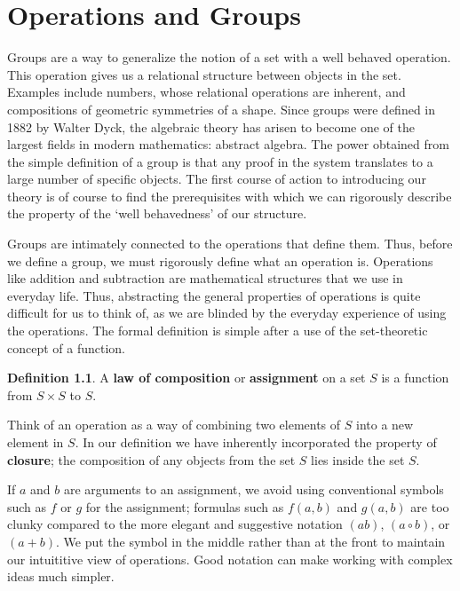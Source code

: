 \documentclass[12pt]{amsbook}
\theoremstyle{definition}
\newtheorem{definition}{Definition}
\begin{document}
\chapter{Operations and Groups}

Groups are a way to generalize the notion of a set with a well behaved operation. This operation gives us a relational structure between objects in the set. Examples include numbers, whose relational operations are inherent, and compositions of geometric symmetries of a shape. Since groups were defined in 1882 by Walter Dyck, the algebraic theory has arisen to become one of the largest fields in modern mathematics: abstract algebra. The power obtained from the simple definition of a group is that any proof in the system translates to a large number of specific objects. The first course of action to introducing our theory is of course to find the prerequisites with which we can rigorously describe the property of the `well behavedness' of our structure.

Groups are intimately connected to the operations that define them. Thus, before we define a group, we must rigorously define what an operation is. Operations like addition and subtraction are mathematical structures that we use in everyday life. Thus, abstracting the general properties of operations is quite difficult for us to think of, as we are blinded by the everyday experience of using the operations. The formal definition is simple after a use of the set-theoretic concept of a function.

\begin{definition} A {\bf law of composition} or {\bf assignment} on a set $S$ is a function from $S \times S$ to $S$. \end{definition}

Think of an operation as a way of combining two elements of $S$ into a new element in $S$. In our definition we have inherently incorporated the property of {\bf closure}; the composition of any objects from the set $S$ lies inside the set $S$.

If $a$ and $b$ are arguments to an assignment, we avoid using conventional symbols such as $f$ or $g$ for the assignment; formulas such as $f(a,b)$ and $g(a,b)$ are too clunky compared to the more elegant and suggestive notation $(ab)$, $(a \circ b)$, or $(a + b)$. We put the symbol in the middle rather than at the front to maintain our intuititive view of operations. Good notation can make working with complex ideas much simpler.
\end{document}
